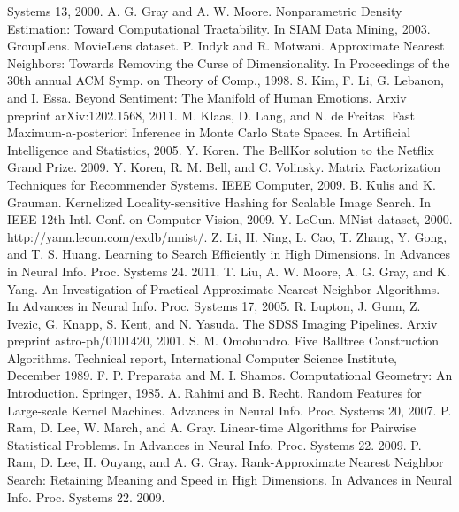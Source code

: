 \documentclass[twocolumn,a4paper]{article}
\begin{document}
\begin{thebibliography}{1}
Systems 13, 2000.
 A. G. Gray and A. W. Moore. Nonparametric Density Estimation: Toward Computational Tractability. In SIAM Data Mining, 2003.
 GroupLens. MovieLens dataset.
 P. Indyk and R. Motwani. Approximate Nearest Neighbors: Towards Removing the Curse of Dimensionality. In Proceedings of the 30th annual ACM Symp. on Theory of Comp., 1998.
 S. Kim, F. Li, G. Lebanon, and I. Essa. Beyond Sentiment: The Manifold of Human Emotions. Arxiv preprint arXiv:1202.1568, 2011.
 M. Klaas, D. Lang, and N. de Freitas. Fast Maximum-a-posteriori Inference in Monte Carlo State Spaces. In Artificial Intelligence and Statistics, 2005.
 Y. Koren. The BellKor solution to the Netflix Grand Prize. 2009.
 Y. Koren, R. M. Bell, and C. Volinsky. Matrix Factorization Techniques for Recommender Systems.
IEEE Computer, 2009.
 B. Kulis and K. Grauman. Kernelized Locality-sensitive Hashing for Scalable Image Search.  In IEEE 12th Intl. Conf. on Computer Vision, 2009.
 Y. LeCun. MNist dataset, 2000. http://yann.lecun.com/exdb/mnist/.
 Z. Li, H. Ning, L. Cao, T. Zhang, Y. Gong, and T. S. Huang. Learning to Search Efficiently in High Dimensions. In Advances in Neural Info. Proc. Systems 24. 2011.
 T. Liu, A. W. Moore, A. G. Gray, and K. Yang. An Investigation of Practical Approximate Nearest Neighbor Algorithms. In Advances in Neural Info. Proc. Systems 17, 2005.
 R. Lupton, J. Gunn, Z. Ivezic, G. Knapp, S. Kent, and N. Yasuda. The SDSS Imaging Pipelines. Arxiv preprint astro-ph/0101420, 2001.
 S. M. Omohundro. Five Balltree Construction Algorithms. Technical report, International Computer Science Institute, December 1989.
 F. P. Preparata and M. I. Shamos. Computational Geometry: An Introduction. Springer, 1985.
 A. Rahimi and B. Recht. Random Features for Large-scale Kernel Machines. Advances in Neural Info. Proc. Systems 20, 2007.
 P. Ram, D. Lee, W. March, and A. Gray. Linear-time Algorithms for Pairwise Statistical Problems. In Advances in Neural Info. Proc. Systems 22. 2009.
 P. Ram, D. Lee, H. Ouyang, and A. G. Gray. Rank-Approximate Nearest Neighbor Search: Retaining Meaning and Speed in High Dimensions. In Advances in Neural Info. Proc. Systems 22. 2009.
\end{thebibliography}
\end{document}
